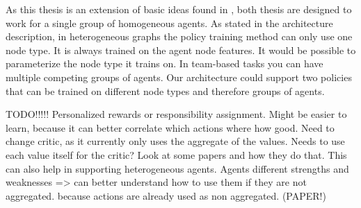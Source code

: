 As this thesis is an extension of basic ideas found in \citet{RobinRuede2021}, both thesis are designed to work for a single group of homogeneous agents. As stated in the architecture description, in heterogeneous graphs the policy training method can only use one node type. It is always trained on the agent node features. It would be possible to parameterize the node type it trains on. In team-based tasks you can have multiple competing groups of agents. Our architecture could support two policies that can be trained on different node types and therefore groups of agents. \par

TODO!!!!!
Personalized rewards or responsibility assignment. Might be easier to learn, because it can better correlate which actions where how good. Need to change critic, as it currently only uses the aggregate of the values. Needs to use each value itself for the critic? Look at some papers and how they do that. This can also help in supporting heterogeneous agents. Agents different strengths and weaknesses => can better understand how to use them if they are not aggregated. because actions are already used as non aggregated. (PAPER!)